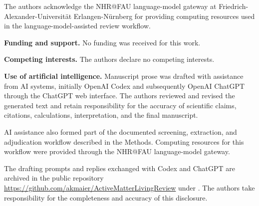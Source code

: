 The authors acknowledge the NHR@FAU
language-model gateway at
Friedrich-Alexander-Universit\"at
Erlangen-N\"urnberg for providing
computing resources used in the
language-model-assisted review workflow.

\noindent\textbf{Funding and support.}
No funding was received for this work.

\noindent\textbf{Competing interests.}
The authors declare no competing interests.

\noindent\textbf{Use of artificial intelligence.}
Manuscript prose was drafted with assistance
from AI systems, initially OpenAI Codex
and subsequently OpenAI ChatGPT through
the ChatGPT web interface. The authors
reviewed and revised the generated text
and retain responsibility for the
accuracy of scientific claims,
citations, calculations, interpretation,
and the final manuscript.

AI assistance also formed part of the
documented screening, extraction, and
adjudication workflow described in the
Methods. Computing resources for this
workflow were provided through the
NHR@FAU language-model gateway.

The drafting prompts and replies
exchanged with Codex and ChatGPT
are archived in the public repository
\url{https://github.com/akmaier/ActiveMatterLivingReview}
under .
The authors take responsibility for
the completeness and accuracy of
this disclosure.